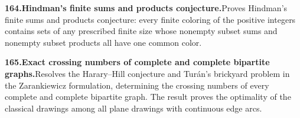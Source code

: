 \documentclass[11pt,a4paper]{article}
\begin{document}
  \par \begin{minipage}{\linewidth}
  \fontsize{10.5}{12.6}\selectfont\RaggedRight
  \hypertarget{result 164}{}
  {\bfseries\textcolor{muted}{164.}\enspace Hindman's finite sums and products conjecture.}\enspace Proves Hindman's finite sums and products conjecture: every finite coloring of the positive integers contains sets of any prescribed finite size whose nonempty subset sums and nonempty subset products all have one common color.\par
  \end{minipage}\par\vspace{5pt}



  \par \begin{minipage}{\linewidth}
  \fontsize{10.5}{12.6}\selectfont\RaggedRight
  \hypertarget{result 165}{}
  {\bfseries\textcolor{muted}{165.}\enspace Exact crossing numbers of complete and complete bipartite graphs.}\enspace Resolves the Harary--Hill conjecture and Tur\'an's brickyard problem in the Zarankiewicz formulation, determining the crossing numbers of every complete and complete bipartite graph. The result proves the optimality of the classical drawings among all plane drawings with continuous edge arcs.\par
  \end{minipage}\par\vspace{5pt}
\end{document}
